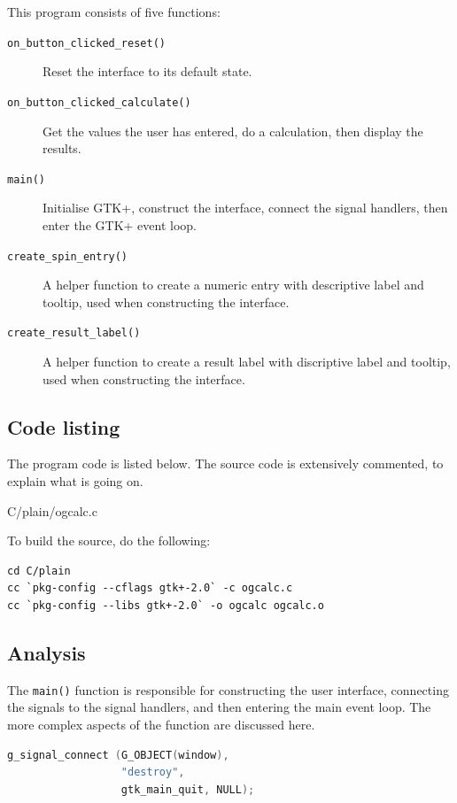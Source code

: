 \documentclass[a4paper,oneside]{article}
\newcommand{\filename}[1]{\texttt{#1}}
\newcommand{\function}[1]{\texttt{#1()}}
\begin{document}
This program consists of five functions:

\begin{description}
\item[\function{on\_button\_clicked\_reset}] Reset the interface to its default state.
\item[\function{on\_button\_clicked\_calculate}] Get the values the user has entered, do
  a calculation, then display the results.
\item[\function{main}] Initialise GTK+, construct the interface,
  connect the signal handlers, then enter the GTK+ event loop.
\item[\function{create\_spin\_entry}] A helper function to create a
  numeric entry with descriptive label and tooltip, used when
  constructing the interface.
\item[\function{create\_result\_label}] A helper function to create a
  result label with discriptive label and tooltip, used when
  constructing the interface.
\end{description}

\subsection{Code listing}

The program code is listed below.  The source code is extensively
commented, to explain what is going on.



                 {C/plain/ogcalc.c}

To build the source, do the following:

\begin{verbatim}
cd C/plain
cc `pkg-config --cflags gtk+-2.0` -c ogcalc.c
cc `pkg-config --libs gtk+-2.0` -o ogcalc ogcalc.o
\end{verbatim}

\subsection{Analysis}

The \function{main} function is responsible for constructing the user
interface, connecting the signals to the signal handlers, and then
entering the main event loop.  The more complex aspects of the
function are discussed here.

\begin{lstlisting}[numbers=none, language=C]
g_signal_connect (G_OBJECT(window),
                  "destroy",
                  gtk_main_quit, NULL);
\end{lstlisting}
\end{document}
